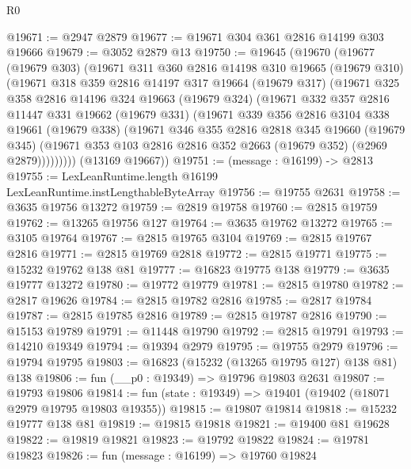 \begin{lexlean}{R0}
\begin{coremodule}
@19671 := @2947 @2879
@19677 := @19671 @304 @361 @2816 @14199 @303 @19666
@19679 := @3052 @2879 @13
@19750 := @19645
    (@19670
      (@19677
        (@19679 @303)
        (@19671
          @311
          @360
          @2816
          @14198
          @310
          @19665
          (@19679 @310)
          (@19671
            @318
            @359
            @2816
            @14197
            @317
            @19664
            (@19679 @317)
            (@19671
              @325
              @358
              @2816
              @14196
              @324
              @19663
              (@19679 @324)
              (@19671
                @332
                @357
                @2816
                @11447
                @331
                @19662
                (@19679 @331)
                (@19671
                  @339
                  @356
                  @2816
                  @3104
                  @338
                  @19661
                  (@19679 @338)
                  (@19671
                    @346
                    @355
                    @2816
                    @2818
                    @345
                    @19660
                    (@19679 @345)
                    (@19671 @353 @103 @2816 @2816 @352 @2663 (@19679 @352) (@2969 @2879)))))))))
      (@13169 @19667))
@19751 := (message : @16199) -> @2813
@19755 := LexLeanRuntime.length @16199 LexLeanRuntime.instLengthableByteArray
@19756 := @19755 @2631
@19758 := @3635 @19756 @13272
@19759 := @2819 @19758
@19760 := @2815 @19759
@19762 := @13265 @19756 @127
@19764 := @3635 @19762 @13272
@19765 := @3105 @19764
@19767 := @2815 @19765 @3104
@19769 := @2815 @19767 @2816
@19771 := @2815 @19769 @2818
@19772 := @2815 @19771
@19775 := @15232 @19762 @138 @81
@19777 := @16823 @19775 @138
@19779 := @3635 @19777 @13272
@19780 := @19772 @19779
@19781 := @2815 @19780
@19782 := @2817 @19626
@19784 := @2815 @19782 @2816
@19785 := @2817 @19784
@19787 := @2815 @19785 @2816
@19789 := @2815 @19787 @2816
@19790 := @15153 @19789
@19791 := @11448 @19790
@19792 := @2815 @19791
@19793 := @14210 @19349
@19794 := @19394 @2979
@19795 := @19755 @2979
@19796 := @19794 @19795
@19803 := @16823 (@15232 (@13265 @19795 @127) @138 @81) @138
@19806 := fun (__p0 : @19349) => @19796 @19803 @2631
@19807 := @19793 @19806
@19814 := fun (state : @19349) => @19401 (@19402 (@18071 @2979 @19795 @19803 @19355))
@19815 := @19807 @19814
@19818 := @15232 @19777 @138 @81
@19819 := @19815 @19818
@19821 := @19400 @81 @19628
@19822 := @19819 @19821
@19823 := @19792 @19822
@19824 := @19781 @19823
@19826 := fun (message : @16199) => @19760 @19824

\end{coremodule}
\end{lexlean}
